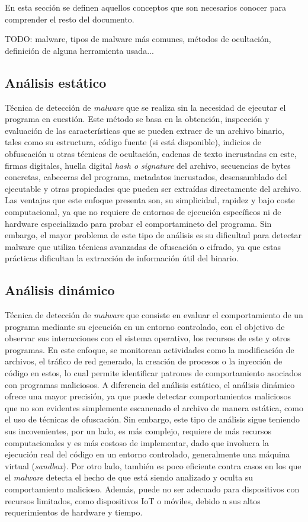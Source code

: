 
En esta sección se definen aquellos conceptos que son necesarios conocer para comprender el resto del documento.

TODO: malware, tipos de malware más comunes, métodos de ocultación, definición de alguna herramienta usada...

\subsection{Análisis estático}
Técnica de detección de \textit{malware} que se realiza sin la necesidad de ejecutar el programa en cuestión. Este método se basa en la obtención, inspección y evaluación de las características que se pueden extraer de un archivo binario, tales como su estructura, código fuente (si está disponible), indicios de obfuscación u otras técnicas de ocultación, cadenas de texto incrustadas en este, firmas digitales, huella digital \textit{hash o signature} del archivo, secuencias de bytes concretas, cabeceras del programa, metadatos incrustados, desensamblado del ejecutable y otras propiedades que pueden ser extraídas directamente del archivo. Las ventajas que este enfoque presenta son, su simplicidad, rapidez y bajo coste computacional, ya que no requiere de entornos de ejecución específicos ni de hardware especializado para probar el comportamineto del programa. Sin embargo, el mayor problema de este tipo de análisis es su dificultad para detectar malware que utiliza técnicas avanzadas de ofuscación o cifrado, ya que estas prácticas dificultan la extracción de información útil del binario.

\subsection{Análisis dinámico}
Técnica de detección de \textit{malware} que consiste en evaluar el comportamiento de un programa mediante su ejecución en un entorno controlado, con el objetivo de observar sus interacciones con el sistema operativo, los recursos de este y otros programas. En este enfoque, se monitorean actividades como la modificación de archivos, el tráfico de red generado, la creación de procesos o la inyección de código en estos, lo cual permite identificar patrones de comportamiento asociados con programas maliciosos. A diferencia del análisis estático, el análisis dinámico ofrece una mayor precisión, ya que puede detectar comportamientos maliciosos que no son evidentes simplemente escanenado el archivo de manera estática, como el uso de técnicas de ofuscación. Sin embargo, este tipo de análisis sigue teniendo sus incovenientes, por un lado, es más complejo, requiere de más recursos computacionales y es más costoso de implementar, dado que involucra la ejecución real del código en un entorno controlado, generalmente una máquina virtual (\textit{sandbox}). Por otro lado, también es poco eficiente contra casos en los que el \textit{malware} detecta el hecho de que está siendo analizado y oculta su comportamiento malicioso. Además, puede no ser adecuado para dispositivos con recursos limitados, como dispositivos IoT o móviles, debido a sus altos requerimientos de hardware y tiempo.

